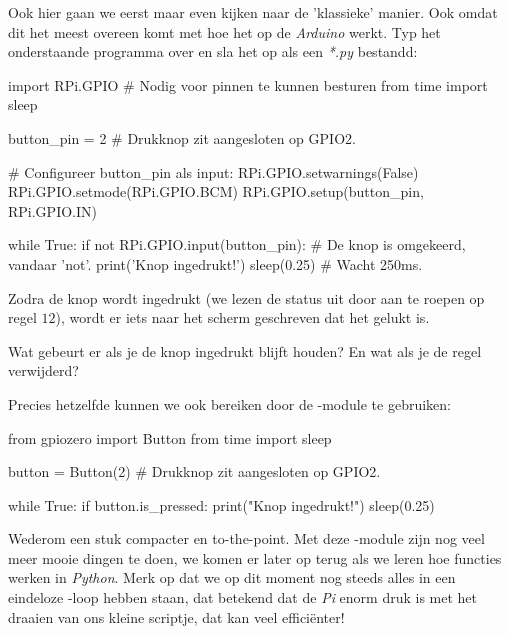 Ook hier gaan we eerst maar even kijken naar de 'klassieke' manier. Ook omdat dit het meest overeen komt met hoe het op de \textit{Arduino} werkt. Typ het onderstaande programma over en sla het op als een \textit{*.py} bestandd:
\begin{python}
import RPi.GPIO  # Nodig voor pinnen te kunnen besturen
from time import sleep

button_pin = 2  # Drukknop zit aangesloten op GPIO2.

# Configureer button_pin als input:
RPi.GPIO.setwarnings(False)
RPi.GPIO.setmode(RPi.GPIO.BCM)
RPi.GPIO.setup(button_pin, RPi.GPIO.IN)

while True:
    if not RPi.GPIO.input(button_pin):  # De knop is omgekeerd, vandaar 'not'.
        print('Knop ingedrukt!')
        sleep(0.25)                     # Wacht 250ms.
\end{python}


Zodra de knop wordt ingedrukt (we lezen de status uit door  aan te roepen op regel $12$), wordt er iets naar het scherm geschreven dat het gelukt is.

\begin{exercise}
Wat gebeurt er als je de knop ingedrukt blijft houden? En wat als je de  regel verwijderd?
\end{exercise}

Precies hetzelfde kunnen we ook bereiken door de -module te gebruiken:
\begin{python}
from gpiozero import Button
from time import sleep 

button = Button(2)  # Drukknop zit aangesloten op GPIO2.

while True: 
    if button.is_pressed: 
        print("Knop ingedrukt!") 
        sleep(0.25)
\end{python}

Wederom een stuk compacter en to-the-point. Met deze -module zijn nog veel meer mooie dingen te doen, we komen er later op terug als we leren hoe functies werken in \textit{Python}. Merk op dat we op dit moment nog steeds alles in een eindeloze -loop hebben staan, dat betekend dat de \textit{Pi} enorm druk is met het draaien van ons kleine scriptje, dat kan veel efficiënter!

